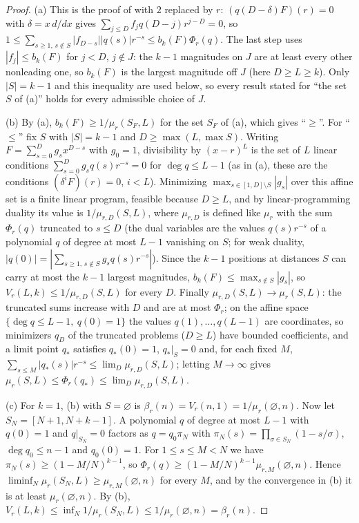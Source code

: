 \documentclass[11pt]{article}
\begin{document}
\begin{proof}
(a) This is the proof of \cite[Lemma~4.5]{coefficient-mass} with $2$ replaced by $r$:
$(q(D-\delta)F)(r)=0$ with $\delta=x\,d/dx$ gives
$\sum_{j\le D}f_jq(D-j)r^{j-D}=0$, so
$1\le\sum_{s\ge1,\,s\notin S}|f_{D-s}||q(s)|r^{-s}\le b_k(F)\Phi_r(q)$.
The last step uses $|f_j|\le b_k(F)$ for $j<D$, $j\notin J$: the $k-1$
magnitudes on $J$ are at least every other nonleading one, so $b_k(F)$ is
the largest magnitude off $J$ (here $D\ge L\ge k$).  Only $|S|=k-1$ and
this inequality are used below, so every result stated for ``the set $S$
of (a)'' holds for every admissible choice of $J$.

(b) By (a), $b_k(F)\ge1/\mu_r(S_F,L)$ for the set $S_F$ of (a), which
gives ``$\ge$''.  For ``$\le$'' fix $S$ with $|S|=k-1$ and $D\ge\max(L,\max S)$.
Writing $F=\sum_{s=0}^Dg_sx^{D-s}$ with $g_0=1$, divisibility by
$(x-r)^L$ is the set of $L$ linear conditions
$\sum_{s=0}^Dg_sq(s)r^{-s}=0$ for $\deg q\le L-1$ (as in (a), these are the
conditions $(\delta^iF)(r)=0$, $i<L$).  Minimizing
$\max_{s\in[1,D]\setminus S}|g_s|$ over this affine set is a finite linear
program, feasible because $D\ge L$, and by linear-programming duality its value is
$1/\mu_{r,D}(S,L)$, where $\mu_{r,D}$ is defined like $\mu_r$ with the sum
$\Phi_r(q)$ truncated to $s\le D$ (the dual variables are the values
$q(s)r^{-s}$ of a polynomial $q$ of degree at most $L-1$ vanishing on $S$;
for weak duality, $|q(0)|=|\sum_{s\ge1,\,s\notin S}g_sq(s)r^{-s}|$).  Since
the $k-1$ positions at distances $S$ can carry at most the $k-1$ largest
magnitudes, $b_k(F)\le\max_{s\notin S}|g_s|$, so
$V_r(L,k)\le1/\mu_{r,D}(S,L)$ for every $D$.  Finally
$\mu_{r,D}(S,L)\to\mu_r(S,L)$: the truncated sums increase with $D$ and
are at most $\Phi_r$; on the affine space $\{\deg q\le L-1,\ q(0)=1\}$ the
values $q(1),\ldots,q(L-1)$ are coordinates, so minimizers $q_D$ of the
truncated problems ($D\ge L$) have bounded coefficients, and a limit point
$q_*$ satisfies $q_*(0)=1$, $q_*|_S=0$ and, for each fixed $M$,
$\sum_{s\le M}|q_*(s)|r^{-s}\le\lim_D\mu_{r,D}(S,L)$; letting $M\to\infty$
gives $\mu_r(S,L)\le\Phi_r(q_*)\le\lim_D\mu_{r,D}(S,L)$.

(c) For $k=1$, (b) with $S=\varnothing$ is $\beta_r(n)=V_r(n,1)=1/\mu_r(\varnothing,n)$.
Now let $S_N=[N+1,N+k-1]$.  A polynomial $q$ of degree at most $L-1$ with
$q(0)=1$ and $q|_{S_N}=0$ factors as $q=q_0\pi_N$ with
$\pi_N(s)=\prod_{\sigma\in S_N}(1-s/\sigma)$, $\deg q_0\le n-1$ and
$q_0(0)=1$.  For $1\le s\le M<N$ we have $\pi_N(s)\ge(1-M/N)^{k-1}$, so
$\Phi_r(q)\ge(1-M/N)^{k-1}\mu_{r,M}(\varnothing,n)$.  Hence
$\liminf_N\mu_r(S_N,L)\ge\mu_{r,M}(\varnothing,n)$ for every $M$, and by
the convergence in (b) it is at least $\mu_r(\varnothing,n)$.  By (b),
$V_r(L,k)\le\inf_N1/\mu_r(S_N,L)\le1/\mu_r(\varnothing,n)=\beta_r(n)$.
\end{proof}
\end{document}
